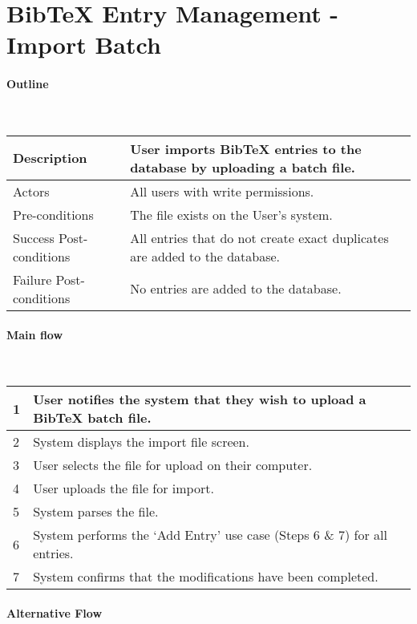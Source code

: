 \section*{BibTeX Entry Management - Import Batch}

\paragraph*{Outline} \

\begin{tabular}{ | l | l | }
\hline
Description & User imports BibTeX entries to the database by uploading a batch file. \\ \hline
Actors & All users with write permissions. \\ \hline
Pre-conditions & The file exists on the User's system. \\ \hline
Success Post-conditions & All entries that do not create exact duplicates are added to the database. \\ \hline
Failure Post-conditions & No entries are added to the database. \\ \hline
\end{tabular}


\paragraph*{Main flow} \

\begin{tabular}{ | l | l | } \hline
1 & User notifies the system that they wish to upload a BibTeX batch file. \\ \hline
2 & System displays the import file screen. \\ \hline
3 & User selects the file for upload on their computer. \\ \hline
4 & User uploads the file for import. \\ \hline
5 & System parses the file. \\ \hline
6 & System performs the `Add Entry' use case (Steps 6 \& 7) for all entries. \\ \hline
7 & System confirms that the modifications have been completed. \\ \hline
\end{tabular}


\paragraph*{Alternative Flow} \

